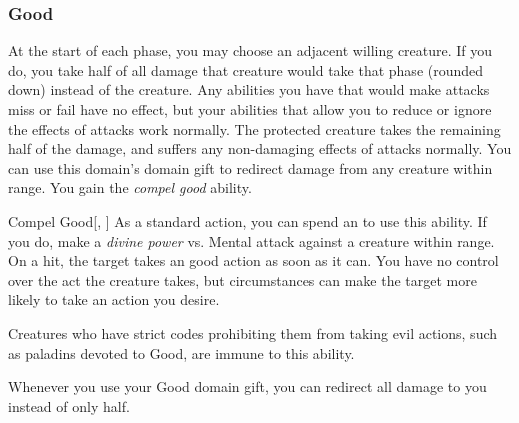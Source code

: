         \subsubsection{Good}
             At the start of each phase, you may choose an adjacent willing creature.
            If you do, you take half of all damage that creature would take that phase (rounded down) instead of the creature.
            Any abilities you have that would make attacks miss or fail have no effect, but your abilities that allow you to reduce or ignore the effects of attacks work normally.
            The protected creature takes the remaining half of the damage, and suffers any non-damaging effects of attacks normally.
             You can use this domain's domain gift to redirect damage from any creature within \rngclose range.
             You gain the \textit{compel good} ability.
            \begin{ability}{Compel Good}[, ]
                As a standard action, you can spend an  to use this ability.
                If you do, make a \textit{divine power} vs. Mental attack against a creature within \rngmed range.
                On a hit, the target takes an good action as soon as it can.
                You have no control over the act the creature takes, but circumstances can make the target more likely to take an action you desire.

                Creatures who have strict codes prohibiting them from taking evil actions, such as paladins devoted to Good, are immune to this ability.
            \end{ability}
             Whenever you use your Good domain gift, you can redirect all damage to you instead of only half.

